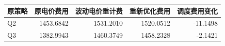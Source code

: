 \begin{tabular}{lrrrr}
\toprule
原策略 & 原电价费用 & 波动电价重计费 & 重新优化费用 & 调度费用变化 \\
\midrule
Q2 & 1453.6842 & 1531.2010 & 1520.0512 & -11.1498 \\
Q3 & 1382.9943 & 1460.3749 & 1458.2328 & -2.1421 \\
\bottomrule
\end{tabular}
